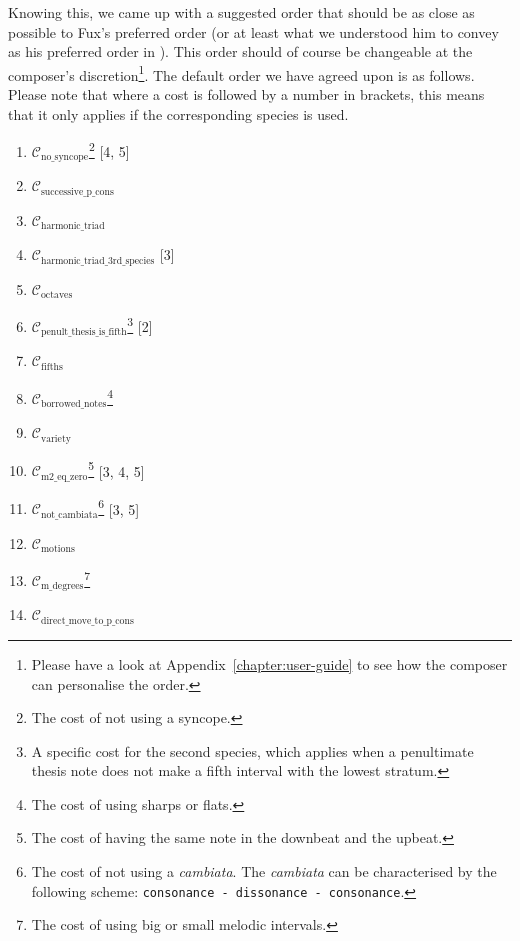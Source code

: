 Knowing this, we came up with a suggested order that should be as close as possible to Fux's preferred order (or at least what we understood him to convey as his preferred order in \gap). This order should of course be changeable at the composer's discretion\footnote{Please have a look at Appendix~\ref{chapter:user-guide} to see how the composer can personalise the order.}. The default order we have agreed upon is as follows. Please note that where a cost is followed by a number in brackets, this means that it only applies if the corresponding species is used.
\begin{multicols}{2}
    \begin{enumerate}\label{fig:default-order-lexico}
        \item $\mathcal{C}_\text{no\_syncope}$\footnote{The cost of not using a syncope.} [4, 5] 
        \item $\mathcal{C}_\text{successive\_p\_cons}$
        \item $\mathcal{C}_\text{harmonic\_triad}$
        \item $\mathcal{C}_\text{harmonic\_triad\_3rd\_species}$ [3]
        \item $\mathcal{C}_\text{octaves}$
        \item $\mathcal{C}_\text{penult\_thesis\_is\_fifth}$\footnote{A specific cost for the second species, which applies when a penultimate thesis note does not make a fifth interval with the lowest stratum.} [2]
        \item $\mathcal{C}_\text{fifths}$
        \item $\mathcal{C}_\text{borrowed\_notes}$\footnote{The cost of using sharps or flats.}
        \item $\mathcal{C}_\text{variety}$
        \item $\mathcal{C}_\text{m2\_eq\_zero}$\footnote{The cost of having the same note in the downbeat and the upbeat.} [3, 4, 5]
        \item $\mathcal{C}_\text{not\_cambiata}$\footnote{The cost of not using a \textit{cambiata}. The \textit{cambiata} can be characterised by the following scheme: \texttt{consonance - dissonance - consonance}.} [3, 5]
        \item $\mathcal{C}_\text{motions}$
        \item $\mathcal{C}_\text{m\_degrees}$\footnote{The cost of using big or small melodic intervals.}        
        \item $\mathcal{C}_\text{direct\_move\_to\_p\_cons}$
    \end{enumerate}
\end{multicols}

